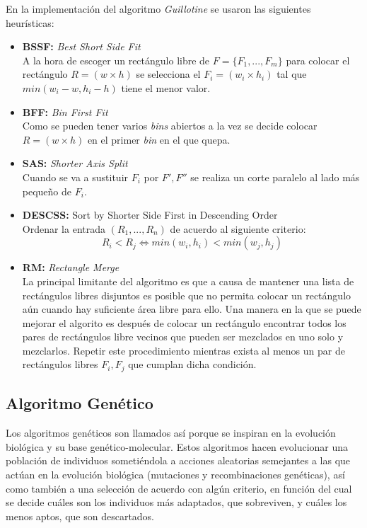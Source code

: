 \documentclass[a4paper,10pt,twocolumn]{article}
\begin{document}
En la implementación del algoritmo \textit{Guillotine} se usaron las siguientes heurísticas:
\begin{itemize}
	\item \textbf{BSSF:} \textit{Best Short Side Fit}\\
	A la hora de escoger un rectángulo libre de $F = \{F_1,...,F_m\}$ para colocar el rectángulo $R = (w \times h)$ se selecciona el $F_i = (w_i \times h_i)$ tal que $min(w_i-w,h_i-h)$ tiene el menor valor. 
	\item \textbf{BFF:} \textit{Bin First Fit}\\
	Como se pueden tener varios \textit{bins} abiertos a la vez se decide colocar $R = (w \times h)$ en el primer \textit{bin} en el que quepa.
	\item \textbf{SAS:} \textit{Shorter Axis Split}\\
	Cuando se va a sustituir $F_i$ por $F',F''$ se realiza un corte paralelo al lado más pequeño de $F_i$.
	\item \textbf{DESCSS:} Sort by Shorter Side First in Descending Order\\
	Ordenar la entrada $(R_1,...,R_n)$ de acuerdo al siguiente criterio:
	$$R_i < R_j \Longleftrightarrow min(w_i,h_i) < min (w_j,h_j)$$ 
	\item \textbf{RM:} \textit{Rectangle Merge}\\
	La principal limitante del algoritmo es que a causa de mantener una lista de rectángulos libres disjuntos es posible que no permita colocar un rectángulo aún cuando hay suficiente área libre para ello. Una manera en la que se puede mejorar el algorito es después de colocar un rectángulo encontrar todos los pares de rectángulos libre vecinos que pueden ser mezclados en uno solo y mezclarlos. Repetir este procedimiento mientras exista al menos un par de rectángulos libres $F_i, F_j$ que cumplan dicha condición.
\end{itemize}



\subsection{Algoritmo Genético}

Los algoritmos genéticos son llamados así porque se inspiran en la evolución biológica y su base genético-molecular. Estos algoritmos hacen evolucionar una población de individuos sometiéndola a acciones aleatorias semejantes a las que actúan en la evolución biológica (mutaciones y recombinaciones genéticas), así como también a una selección de acuerdo con algún criterio, en función del cual se decide cuáles son los individuos más adaptados, que sobreviven, y cuáles los menos aptos, que son descartados.\cite{5}
\end{document}
